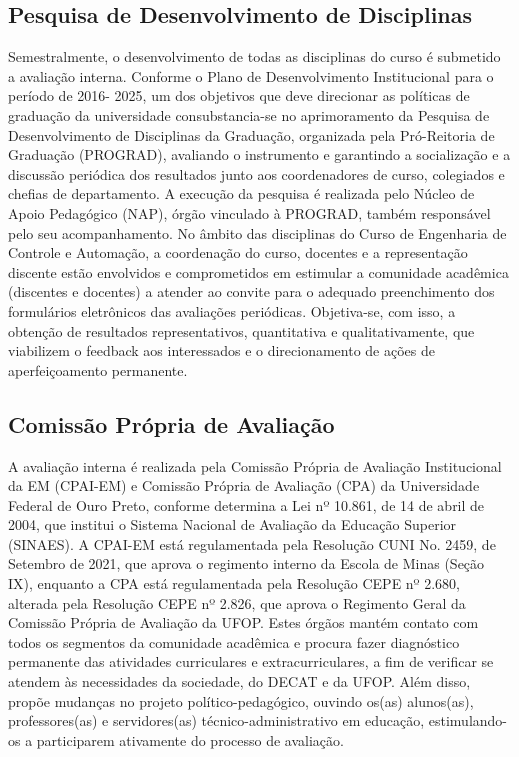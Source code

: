 \documentclass[
	12pt,				%
	openright,			%
	oneside,			%
	a4paper,			%
	english,			%
	brazil				%
	]{abntex2}
\begin{document}
\subsection*{Pesquisa de Desenvolvimento de Disciplinas}

Semestralmente, o desenvolvimento de todas as disciplinas do curso é submetido a avaliação interna. Conforme o Plano de Desenvolvimento Institucional para o período de 2016- 2025, um dos objetivos que deve direcionar as políticas de graduação da universidade consubstancia-se no aprimoramento da Pesquisa de Desenvolvimento de Disciplinas da Graduação, organizada pela Pró-Reitoria de Graduação (PROGRAD), avaliando o instrumento e garantindo a socialização e a discussão periódica dos resultados junto aos coordenadores de curso, colegiados e chefias de departamento. A execução da pesquisa é realizada pelo Núcleo de Apoio Pedagógico (NAP), órgão vinculado à PROGRAD, também responsável pelo seu acompanhamento.
No âmbito das disciplinas do Curso de Engenharia de Controle e Automação, a coordenação do curso, docentes e a representação discente estão envolvidos e comprometidos em estimular a comunidade acadêmica (discentes e docentes) a atender ao convite para o adequado preenchimento dos formulários eletrônicos das avaliações periódicas. Objetiva-se, com isso, a obtenção de resultados representativos, quantitativa e qualitativamente, que viabilizem o feedback aos interessados e o direcionamento de ações de aperfeiçoamento permanente.

\subsection*{Comissão Própria de Avaliação}

A avaliação interna é realizada pela Comissão Própria de Avaliação Institucional da EM (CPAI-EM) e Comissão Própria de Avaliação (CPA) da Universidade Federal de Ouro Preto, conforme determina a Lei nº 10.861, de 14 de abril de 2004, que institui o Sistema Nacional de Avaliação da Educação Superior (SINAES). A CPAI-EM está regulamentada pela Resolução CUNI No. 2459, de Setembro de 2021, que aprova o regimento interno da Escola de Minas (Seção IX), enquanto a CPA está regulamentada pela Resolução CEPE nº 2.680, alterada pela Resolução CEPE nº 2.826, que aprova o Regimento Geral da Comissão Própria de Avaliação da UFOP. Estes órgãos mantém contato com todos os segmentos da comunidade acadêmica e procura fazer diagnóstico permanente das atividades curriculares e extracurriculares, a fim de verificar se atendem às necessidades da sociedade, do DECAT e da UFOP. Além disso, propõe mudanças no projeto político-pedagógico, ouvindo os(as) alunos(as), professores(as) e servidores(as) técnico-administrativo em educação, estimulando-os a participarem ativamente do processo de avaliação.
\end{document}
